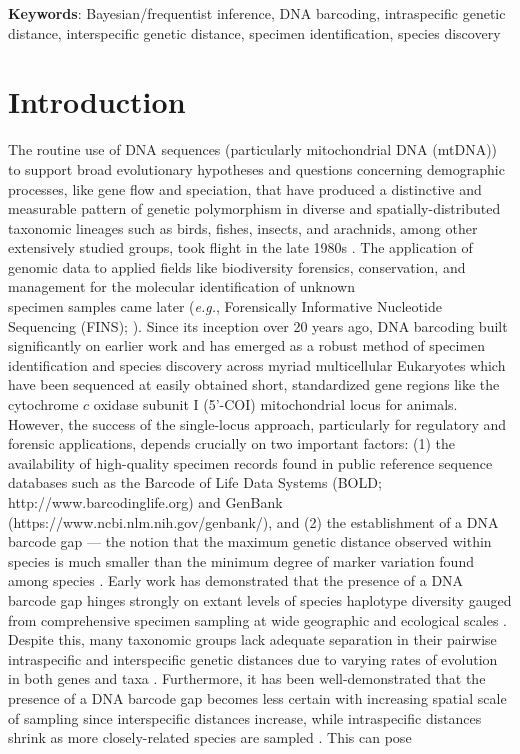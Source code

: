 \documentclass[12pt]{article}
\begin{document}
\textbf{Keywords}: Bayesian/frequentist inference, DNA barcoding, intraspecific genetic \\ distance, interspecific genetic distance, specimen identification, species discovery

\vspace{2mm}

\section{Introduction}

The routine use of DNA sequences (particularly mitochondrial DNA (mtDNA)) to support broad evolutionary hypotheses and questions concerning demographic processes, like gene flow and speciation, that have produced a distinctive and measurable pattern of genetic polymorphism in diverse and spatially-distributed taxonomic lineages such as birds, fishes, insects, and arachnids, among other extensively studied groups, took flight in the late 1980s \citep{avise1987intraspecific}. The application of genomic data to applied fields like biodiversity forensics, conservation, and management for the molecular identification of unknown \\ specimen samples came later (\textit{e.g.}, Forensically Informative Nucleotide Sequencing (FINS); \citet{bartlett1992fins}). Since its inception over 20 years ago, DNA barcoding \citep{hebert2003biological, hebert2003barcoding} built significantly on earlier work and has emerged as a robust method of specimen identification and species discovery across myriad multicellular Eukaryotes which have been sequenced at easily obtained short, standardized gene regions like the cytochrome $c$ oxidase subunit I (5'-COI) mitochondrial locus for animals. However, the success of the single-locus approach, particularly for regulatory and forensic applications, depends crucially on two important factors: (1) the availability of high-quality specimen records found in public reference sequence databases such as the Barcode of Life Data Systems (BOLD;  \\ http://www.barcodinglife.org) \citep{ratnasingham2007bold} and GenBank \\ (https://www.ncbi.nlm.nih.gov/genbank/), and (2) the establishment of a DNA barcode gap --- the notion that the maximum genetic distance observed within species is much smaller than the minimum degree of marker variation found among species \citep{meyer2005dna, meier2008use}. Early work has demonstrated that the presence of a DNA barcode gap hinges strongly on extant levels of species haplotype diversity gauged from comprehensive specimen sampling at wide geographic and ecological scales \citep{bergsten2012effect, candek2015dna}. Despite this, many taxonomic groups lack adequate separation in their pairwise intraspecific and interspecific genetic distances due to varying rates of evolution in both genes and taxa \citep{pentinsaari2016molecular}. Furthermore, it has been well-demonstrated that the presence of a DNA barcode gap becomes less certain with increasing spatial scale of sampling since interspecific distances increase, while intraspecific distances shrink as more closely-related species are sampled \citep{phillips2022lack}. This can pose 
\end{document}
